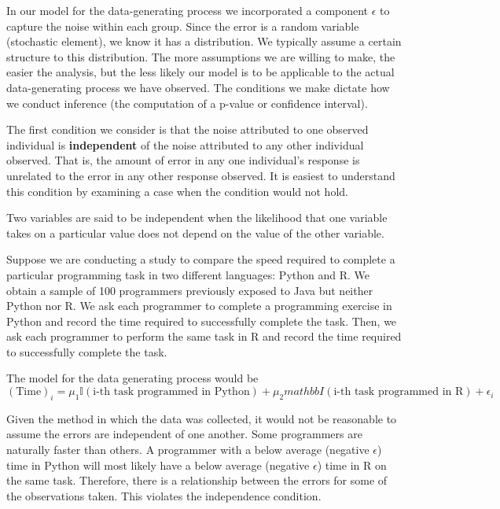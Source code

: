 \documentclass[]{book}
\theoremstyle{definition}
\theoremstyle{definition}
\theoremstyle{remark}
\let\BeginKnitrBlock\begin \let\EndKnitrBlock\end
\begin{document}
In our model for the data-generating process we incorporated a component
\(\epsilon\) to capture the noise within each group. Since the error is
a random variable (stochastic element), we know it has a distribution.
We typically assume a certain structure to this distribution. The more
assumptions we are willing to make, the easier the analysis, but the
less likely our model is to be applicable to the actual data-generating
process we have observed. The conditions we make dictate how we conduct
inference (the computation of a p-value or confidence interval).

The first condition we consider is that the noise attributed to one
observed individual is \textbf{independent} of the noise attributed to
any other individual observed. That is, the amount of error in any one
individual's response is unrelated to the error in any other response
observed. It is easiest to understand this condition by examining a case
when the condition would not hold.

\BeginKnitrBlock{definition}[Independence]
\protect\hypertarget{def:defn-independence}{}{\label{def:defn-independence}
{} }Two variables are said to be independent
when the likelihood that one variable takes on a particular value does
not depend on the value of the other variable.
\EndKnitrBlock{definition}

\BeginKnitrBlock{example}[Programming Speed]
\protect\hypertarget{ex:ex-programming}{}{\label{ex:ex-programming}
{} }Suppose we are conducting a study to
compare the speed required to complete a particular programming task in
two different languages: Python and R. We obtain a sample of 100
programmers previously exposed to Java but neither Python nor R. We ask
each programmer to complete a programming exercise in Python and record
the time required to successfully complete the task. Then, we ask each
programmer to perform the same task in R and record the time required to
successfully complete the task.

The model for the data generating process would be \[
(\text{Time})_i = \mu_1 \mathbb{I}(\text{i-th task programmed in Python}) + \mu_2 mathbb{I}(\text{i-th task programmed in R}) + \epsilon_i
\]

Given the method in which the data was collected, it would not be
reasonable to assume the errors are independent of one another. Some
programmers are naturally faster than others. A programmer with a below
average (negative \(\epsilon\)) time in Python will most likely have a
below average (negative \(\epsilon\)) time in R on the same task.
Therefore, there is a relationship between the errors for some of the
observations taken. This violates the independence condition.
\EndKnitrBlock{example}
\end{document}
